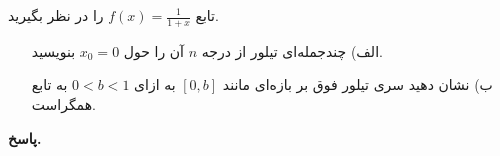 تابع
\(f(x) = \frac{1}{1+x}\)
را در نظر بگیرید.
\begin{enumerate}
	\item[الف)]چندجمله‌ای تیلور از درجه
	\(n\)
آن را حول
\(x_0=0\)
 بنویسید.
	\vspace*{.3cm}
	\item[ب)] 
نشان دهید سری تیلور فوق بر بازه‌ای مانند
\([0,b]\)
به ازای
\(0<b<1\)
به تابع همگراست.
\end{enumerate}



\begin{answer}

	\textbf{پاسخ.}
	
\end{answer}
